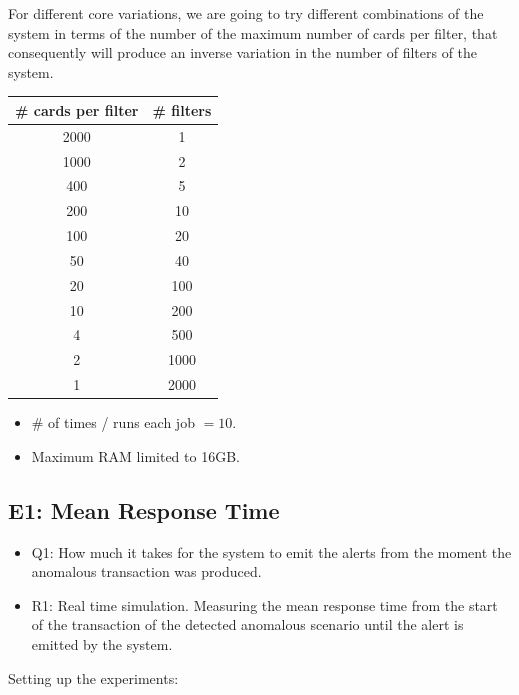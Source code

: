 \documentclass[12pt,a4paper]{article}
\begin{document}
For different core variations, we are going to try different combinations of the system in terms
of the number of the maximum number of cards per filter, that consequently will produce an inverse variation in the number of filters of the system.

\begin{table}[H]
  \renewcommand{\arraystretch}{1.5} %
  \centering
  \begin{tabular}{|c|c|}
  \hline
  \# cards per filter & \# filters \\ \hline
  2000   &   1     \\ \hline
  1000   &   2     \\ \hline
  400 &   5     \\ \hline
  200  &   10     \\ \hline
  100 &   20    \\ \hline
  50  &   40    \\ \hline
  20  &   100    \\ \hline
  10  &   200    \\ \hline
  4  &   500    \\ \hline
  2  &   1000    \\ \hline
  1  &   2000    \\ \hline
  \end{tabular}
\end{table}

\begin{itemize}
  \item \# of times / runs each job $=10$.
  \item Maximum RAM limited to 16GB.
\end{itemize}

\subsection{E1: Mean Response Time}

\begin{itemize}
  \item Q1: How much it takes for the system to emit the alerts from the moment the anomalous transaction was produced.
  \item R1: Real time simulation. Measuring the mean response time from the start of the transaction of the detected anomalous scenario until the alert is emitted by the system.
\end{itemize}

Setting up the experiments:
\end{document}
